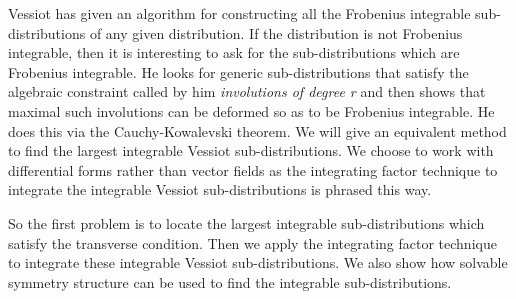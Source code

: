 \documentclass[a4paper, 11pt]{amsart}
\theoremstyle{definition}
\begin{document}
Vessiot \cite{Vessiot1924} has given an algorithm for constructing all the Frobenius integrable sub-distributions of any given distribution. If the distribution is not Frobenius integrable, then it is interesting to ask for the sub-distributions which are Frobenius integrable. He looks for generic sub-distributions that satisfy the algebraic constraint called by him \emph{involutions of degree r} and then shows that maximal such involutions can be deformed so as to be Frobenius integrable. He does this via the Cauchy-Kowalevski theorem. We will give an equivalent method to find the largest integrable Vessiot sub-distributions. We choose to work with differential forms rather than vector fields as the integrating factor technique \cite{sherr} to integrate the integrable Vessiot sub-distributions is phrased this way.

 So the first problem is to locate the largest integrable sub-distributions which satisfy the transverse condition.  Then we apply the integrating factor technique \cite{sherr} to integrate these integrable Vessiot sub-distributions. We also show how solvable symmetry structure can be used to find the integrable sub-distributions.
\end{document}

